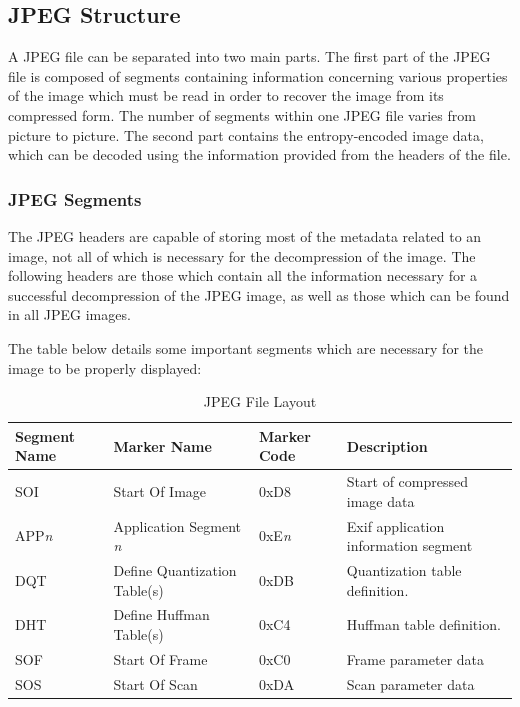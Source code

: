 \subsection{JPEG Structure}
A JPEG file can be separated into two main parts. 
The first part of the JPEG file is composed of segments containing information concerning 
various properties of the image which must be read in order to recover the image from its compressed form. 
The number of segments within one JPEG file varies from picture to picture.
The second part contains the entropy-encoded image data, which can be decoded using the information provided from the headers of the file.  

\subsubsection{JPEG Segments}
The JPEG headers are capable of storing most of the metadata related to an image, not all of which is necessary for the decompression of the image. 
The following headers are those which contain all the information necessary for 
a successful decompression of the JPEG image, as well as those which can be found in all JPEG images.

The table below details some important segments which are necessary for the image
to be properly displayed: \cite{exif_std}

\begin{table}[!hbtp]
	\caption{JPEG File Layout}
	\centering
	\begin{tabular}{ | p{1.5cm} | p{3cm} | p{2cm} | p{2.8cm} | }
	\hline
	\textbf{Segment Name} & \textbf{Marker Name} & 
	\textbf{Marker Code} & \textbf{Description} \\ \hline
	SOI & Start Of Image & 0xD8 & Start of compressed image data\\ \hline
	APP\emph{n} & Application Segment \emph{n} & 0xE\emph{n} & Exif application information segment\\ \hline
	DQT & Define Quantization Table(s) & 0xDB & Quantization table definition.\\ \hline
	DHT & Define Huffman Table(s) & 0xC4 & Huffman table definition.\\ \hline
	SOF & Start Of Frame & 0xC0 & Frame parameter data\\ \hline
	SOS & Start Of Scan & 0xDA & Scan parameter data\\ \hline
	\end{tabular}
\end{table}

